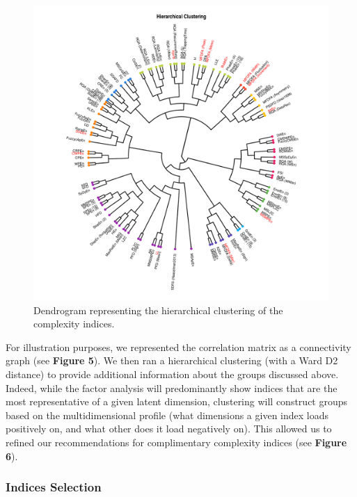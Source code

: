 \documentclass[
  man]{apa6}
\begin{document}
\begin{figure}
\centering
\includegraphics{./figures/clustering-1.pdf}
\caption{\label{fig:clustering}Dendrogram representing the hierarchical clustering of the complexity indices.}
\end{figure}

For illustration purposes, we represented the correlation matrix as a connectivity graph (see \textbf{Figure 5}). We then ran a hierarchical clustering (with a Ward D2 distance) to provide additional information about the groups discussed above. Indeed, while the factor analysis will predominantly show indices that are the most representative of a given latent dimension, clustering will construct groups based on the multidimensional profile (what dimensions a given index loads positively on, and what other does it load negatively on). This allowed us to refined our recommendations for complimentary complexity indices (see \textbf{Figure 6}).

\hypertarget{indices-selection}{%
\subsubsection{Indices Selection}\label{indices-selection}}
\end{document}

